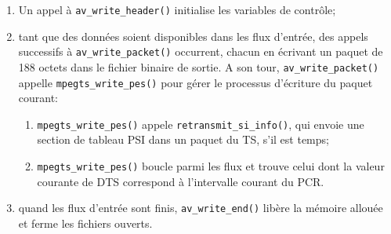 \documentclass[12pt,a4paper]{article}
\begin{document}
\begin{enumerate}
	\item{Un appel à \texttt{av\hspace{0.1mm}\_\hspace{0.1mm}write\hspace{0.1mm}\_\hspace{0.1mm}header()} initialise les variables de contrôle;}
	\item{tant que des données soient disponibles dans les flux d'entrée, des appels successifs à \texttt{av\hspace{0.1mm}\_\hspace{0.1mm}write\hspace{0.1mm}\_\hspace{0.1mm}packet()} occurrent, chacun en écrivant un paquet de 188 octets dans le fichier binaire de sortie. A son tour, \texttt{av\hspace{0.1mm}\_\hspace{0.1mm}write\hspace{0.1mm}\_\hspace{0.1mm}packet()} appelle \texttt{mpegts\hspace{0.1mm}\_\hspace{0.1mm}write\hspace{0.1mm}\_\hspace{0.1mm}pes()} pour gérer le processus d'écriture du paquet courant:}
	\begin{enumerate}
		\item {\label{itm:ret_si_info} \texttt{mpegts\hspace{0.1mm}\_\hspace{0.1mm}write\hspace{0.1mm}\_\hspace{0.1mm}pes()} appele  \texttt{retransmit\hspace{0.1mm}\_\hspace{0.1mm}si\hspace{0.1mm}\_\hspace{0.1mm}info()}, qui envoie une section de tableau PSI dans un paquet du TS, s'il est temps;}
		\item {\label{itm:dts_condition} \texttt{mpegts\hspace{0.1mm}\_\hspace{0.1mm}write\hspace{0.1mm}\_\hspace{0.1mm}pes()} boucle parmi les flux et trouve celui dont la valeur courante de DTS correspond à l'intervalle courant du PCR.}
	\end{enumerate}
	\item{quand les flux d'entrée sont finis, \texttt{av\hspace{0.1mm}\_\hspace{0.1mm}write\hspace{0.1mm}\_\hspace{0.1mm}end()} libère la mémoire allouée et ferme les fichiers ouverts.}
\end{enumerate}
\end{document}
